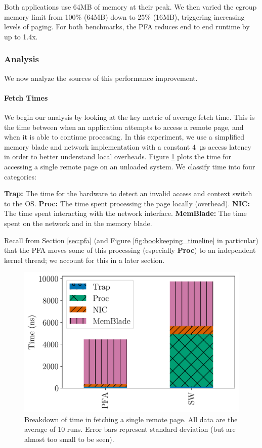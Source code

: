   Both applications use 64MB of memory at their peak. We then
  varied the cgroup memory limit from 100\% (64MB) down to 25\% (16MB),
  triggering increasing levels of paging. For both benchmarks, the PFA reduces
  end to end runtime by up to 1.4x.

\subsubsection{Analysis}
  We now analyze the sources of this performance improvement.
  
  \paragraph{Fetch Times}
  We begin our analysis by looking at the key metric of average fetch time.
  This is the time between when an application attempts to access a remote
  page, and when it is able to continue processing. In this experiment, we use
  a simplified memory blade and network implementation with a constant
  \SI{4}{\micro\second} access latency in order to better understand local
  overheads. Figure \ref{fig:fetch_breakdown} plots the time for accessing a
  single remote page on an unloaded system. We classify time into four
  categories:

  \begin{outline}
    \1 \textbf{Trap:} The time for the hardware to detect an invalid access and
    context switch to the OS.
    \1 \textbf{Proc:} The time spent processing the page locally (overhead).
    \1 \textbf{NIC:} The time spent interacting with the network interface.
    \1 \textbf{MemBlade:} The time spent on the network and in the memory
    blade.
  \end{outline}

  Recall from Section \ref{sec:pfa} (and Figure \ref{fig:bookkeeping_timeline}
  in particular) that the PFA moves some of this processing (especially
  \textbf{Proc}) to an independent kernel thread; we account for this in a
  later section. 

  \begin{figure}[h] \centering
    \includegraphics[width=0.6\columnwidth]{figs/fetch_breakdown.png}
    \vspace{-5mm}
    \caption{Breakdown of time in fetching a single remote page. All data are 
    the average of 10 runs. Error bars represent standard deviation (but are
  almost too small to be seen).}
    \label{fig:fetch_breakdown}
  \end{figure}

